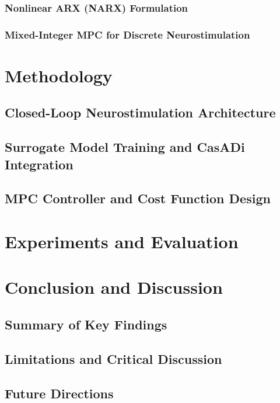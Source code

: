 \documentclass[
    english,
	ruledheaders=section,%
	class=report,%
	thesis={type=master},%
	accentcolor=2c, %
	custommargins=false,
	marginpar=false,
	BCOR=10mm, %
	parskip=half-, %
	fontsize=11pt, %
  	twoside,
  	numbers=noendperiod,
  	fleqn,
  	captions=oneline, %
	captions=tableheading, %
  	IMRAD=false
]{tudapub}
\begin{document}
\subsection{Nonlinear ARX (NARX) Formulation}

\subsection{Mixed-Integer MPC for Discrete Neurostimulation}

\chapter{Methodology}
\section{Closed-Loop Neurostimulation Architecture}
\section{Surrogate Model Training and CasADi Integration}
\section{MPC Controller and Cost Function Design}

\chapter{Experiments and Evaluation}

\chapter{Conclusion and Discussion}
\section{Summary of Key Findings}
\section{Limitations and Critical Discussion}
\section{Future Directions}


\cite{Duden}

\appendix %


\cleardoublepage        %
\printbibliography
\end{document}

